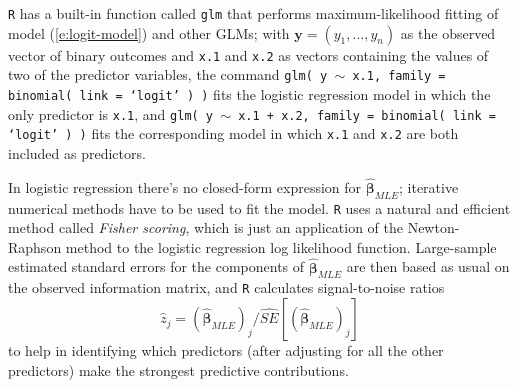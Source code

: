 \documentclass[12pt]{article}
\begin{document}
\texttt{R} has a built-in function called \texttt{glm} that performs maximum-likelihood fitting of model (\ref{e:logit-model}) and other GLMs; with $\bm{ y } = ( y_1, \dots, y_n )$ as the observed vector of binary outcomes and \texttt{x.1} and \texttt{x.2} as vectors containing the values of two of the predictor variables, the command \texttt{glm( y $\sim$ x.1, family = binomial( link = `logit' ) )} fits the logistic regression model in which the only predictor is \texttt{x.1}, and \texttt{glm( y $\sim$ x.1 + x.2, family = binomial( link = `logit' ) )} fits the corresponding model in which \texttt{x.1} and \texttt{x.2} are both included as predictors.

In logistic regression there's no closed-form expression for $\hat{ \bm{ \beta } }_{ MLE }$; iterative numerical methods have to be used to fit the model. \texttt{R} uses a natural and efficient method called \textit{Fisher scoring}, which is just an application of the Newton-Raphson method to the logistic regression log likelihood function. Large-sample estimated standard errors for the components of $\hat{ \bm{ \beta } }_{ MLE }$ are then based as usual on the observed information matrix, and \texttt{R} calculates signal-to-noise ratios
\begin{equation} \label{signal-to-noise-1}
 \hat{ z }_j = \left( \hat{ \bm{ \beta } }_{ MLE } \right)_j / \widehat{ SE } \left[ \left( \hat{ \bm{ \beta } }_{ MLE } \right)_j \right]
\end{equation}
to help in identifying which predictors (after adjusting for all the other predictors) make the strongest predictive contributions.
\end{document}
